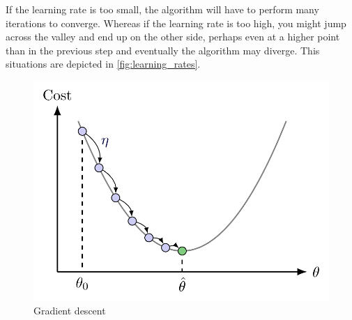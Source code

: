 If the learning rate is too small, the algorithm will have to perform many iterations to converge. Whereas if the learning rate is too high, you might jump across the valley and end up on the other side, perhaps even at a higher point than in the previous step and eventually the algorithm may diverge. This situations are depicted in \autoref{fig:learning_rates}.

\begin{figure}
    \centering
    \includegraphics[width=0.6\linewidth]{img/img-ch1/gd.png}
    \caption{Gradient descent}
    \label{fig:gradient_descent}
\end{figure}

